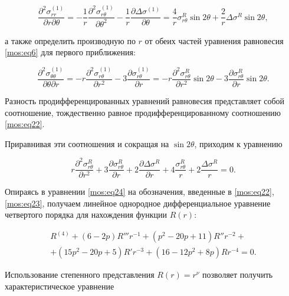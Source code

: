 $$ \frac{\partial^2 \sigma_{rr}^{(1)}}{\partial r \partial \theta}=-\frac1r \frac{\partial^2 \sigma^{(1)}_{r\theta}}{\partial \theta^2}-\frac1r \frac{\partial\Delta\sigma^{(1)}}{\partial \theta}=

\frac4r\sigma_{r\theta}^{R}\sin{2\theta}+\frac2r \Delta\sigma^R \sin{2\theta} ,$$

а также определить производную по $r$ от обеих частей уравнения равновесия  \eqref{mos:eq6} для первого приближения:

$$ \frac{\partial^2 \sigma_{\theta\theta}^{(1)}}{\partial \theta \partial r}=-r\frac{\partial^2 \sigma^{(1)}_{r\theta}}{\partial r^2}-3\frac{\partial \sigma^{(1)}_{r\theta}}{\partial r}=

-r \frac{\partial^2 \sigma^R_{r\theta}}{\partial r^2}\sin2\theta-3\frac{\partial \sigma^R_{r\theta}}{\partial r}\sin2\theta.$$

Разность продифференцированных уравнений равновесия представляет собой соотношение, тождественно равное продифференцированному соотношению \eqref{mos:eq22}. 

Приравнивая эти соотношения и сокращая на $\sin{2\theta}$, приходим к уравнению

\begin{equation}

\label{mos:eq24}

r\frac{\partial^2 \sigma_{r\theta}^R}{\partial r^2}+3\frac{\partial\sigma_{r\theta}^R}{\partial r}+2\frac{\partial\Delta\sigma^R}{\partial r}

+4\frac{\sigma_{r\theta}^R}{r}+2\frac{\Delta\sigma^R}{r}=0.

\end{equation}



Опираясь в уравнении  \eqref{mos:eq24} на обозначения, введенные в   \eqref{mos:eq22},  \eqref{mos:eq23},  получаем линейное однородное дифференциальное уравнение четвертого порядка для нахождения функции $ R(r) $:

\begin{multline}

\label{mos:eq25}

R^{(4)}+(6-2p)R'''r^{-1}+(p^2-20p+11)R'' r^{-2}+\\+

(15p^2-20p+5)R' r^{-3}+(16-12p^2+8p)Rr^{-4}=0.

\end{multline}

Использование степенного представления $R(r)=r^{\nu}$ позволяет получить характеристическое уравнение

